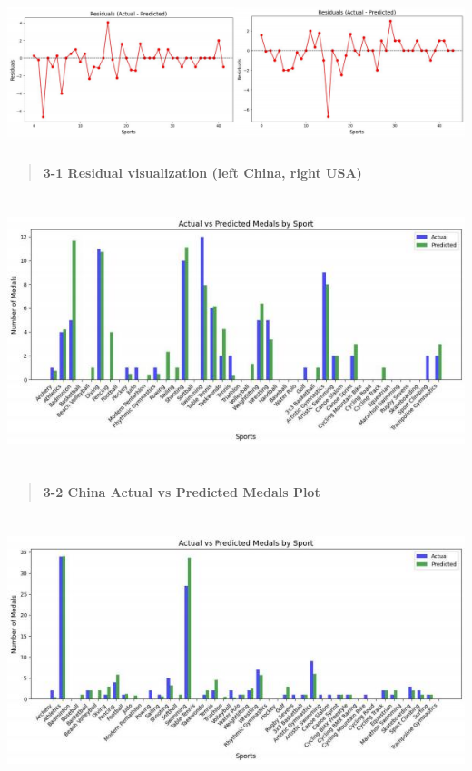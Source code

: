\documentclass[12pt,a4paper]{article}
\renewenvironment{quote}{\begin{quotation}}{\end{quotation}}  %
\begin{document}
    \includegraphics[width=6.115in,height=1.72167in]{./media/media/image9.png}
    
    \begin{quote}
    \textbf{3-1 Residual visualization (left China, right USA)}
    \end{quote}
    
    \includegraphics[width=6.29833in,height=3.125in]{./media/media/image10.jpeg}
    
    \begin{quote}
    \textbf{3-2 China Actual vs Predicted Medals Plot}
    \end{quote}
    
    \includegraphics[width=6.29833in,height=3.125in]{./media/media/image11.jpeg}
    
\end{document}
